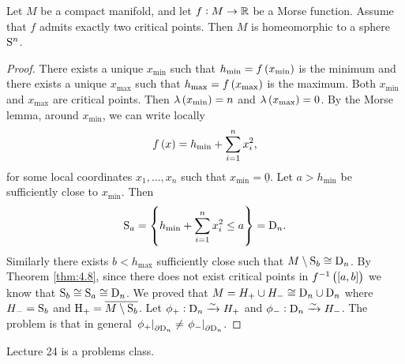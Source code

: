 \pagebreak

\begin{theorem}
Let $ M $ be a compact manifold, and let $ f : M \to \RR $ be a Morse function. Assume that $ f $ admits exactly two critical points. Then $ M $ is homeomorphic to a sphere $ \S^n $.
\end{theorem}

\begin{proof}
There exists a unique $ x_{\min} $ such that $ h_{\min} = f\br{x_{\min}} $ is the minimum and there exists a unique $ x_{\max} $ such that $ h_{\max} = f\br{x_{\max}} $ is the maximum. Both $ x_{\min} $ and $ x_{\max} $ are critical points. Then $ \lambda\br{x_{\min}} = n $ and $ \lambda\br{x_{\max}} = 0 $. By the Morse lemma, around $ x_{\min} $, we can write locally
$$ f\br{x} = h_{\min} + \sum_{i = 1}^n x_i^2, $$
for some local coordinates $ x_1, \dots, x_n $ such that $ x_{\min} = \underline{0} $. Let $ a > h_{\min} $ be sufficiently close to $ x_{\min} $. Then
$$ \S_a = \cbr{h_{\min} + \sum_{i = 1}^n x_i^2 \le a} = \D_n. $$
Similarly there exists $ b < h_{\max} $ sufficiently close such that $ M \setminus \S_b \cong \D_n $. By Theorem \ref{thm:4.8}, since there does not exist critical points in $ f^{-1}\br{\sbr{a, b}} $ we know that $ \S_b \cong \S_a \cong \D_n $. We proved that $ M = H_+ \cup H_- \cong \D_n \cup \D_n $ where $ H_- = \S_b $ and $ \H_+ = \overline{M \setminus \S_b} $. Let $ \phi_+ : \D_n \xrightarrow{\sim} H_+ $ and $ \phi_- : \D_n \xrightarrow{\sim} H_- $. The problem is that in general $ \eval{\phi_+}_{\partial\D_n} \ne \eval{\phi_-}_{\partial\D_n} $.
\end{proof}


Lecture 24 is a problems class.

